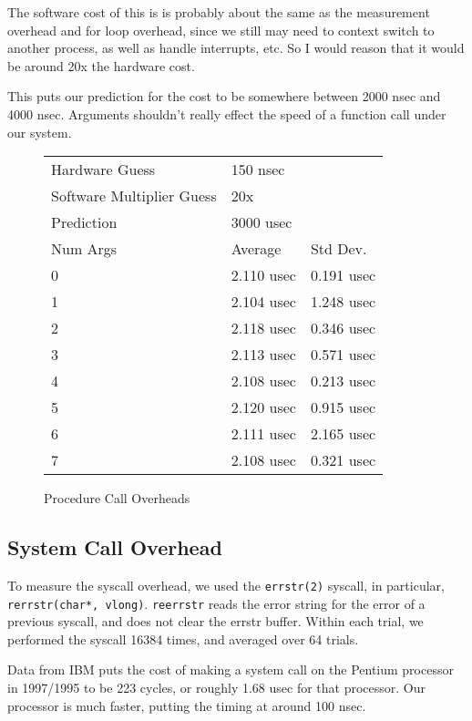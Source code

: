 \documentclass[letterpaper,twocolumn,10pt]{article}
\begin{document}
The software cost of this is is probably about the same as the measurement overhead and for loop overhead, since we still may need to context switch to another process, as well as handle interrupts, etc. So I would reason that it would be around 20x the hardware cost.

This puts our prediction for the cost to be somewhere between 2000 nsec and 4000 nsec. Arguments shouldn't really effect the speed of a function call under our system.

\begin{figure}
	\centering
\begin{tabular}{lll}
Hardware Guess       & 150 nsec & \\
Software Multiplier Guess       & 20x &  \\
Prediction       & 3000 usec &  \\
Num Args & Average    & Std Dev.   \\
0        & 2.110 usec & 0.191 usec \\
1        & 2.104 usec & 1.248 usec \\
2        & 2.118 usec & 0.346 usec \\
3        & 2.113 usec & 0.571 usec \\
4        & 2.108 usec & 0.213 usec \\
5        & 2.120 usec & 0.915 usec \\
6        & 2.111 usec & 2.165 usec \\
7        & 2.108 usec & 0.321 usec
\end{tabular}
\caption{Procedure Call Overheads}
\label{tab:proccalloverheads}
\end{figure}

\subsection{System Call Overhead}

To measure the syscall overhead, we used the \texttt{errstr(2)} syscall, in
particular, \texttt{rerrstr(char*, vlong)}. \texttt{reerrstr} reads the error
string for the error of a previous syscall, and does not clear the errstr
buffer. Within each trial, we performed the syscall 16384 times, and averaged
over 64 trials.

Data from IBM puts the cost of making a system call on the Pentium processor in 1997/1995
to be 223 cycles, or roughly 1.68 usec for that processor. Our processor is much faster,
putting the timing at around 100 nsec.
\end{document}
